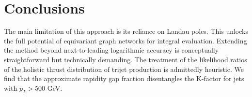\section{Conclusions}\label{sec:conclusions}

The main limitation of this approach is its reliance on Landau poles.
This unlocks the full potential of equivariant graph networks for
integral evaluation. Extending the method beyond next-to-leading
logarithmic accuracy is conceptually straightforward but technically
demanding. The treatment of the likelihood ratios of the holistic thrust
distribution of trijet production is admittedly heuristic. We find that
the approximate rapidity gap fraction disentangles the K-factor for jets
with $p_T > 500$ GeV.

